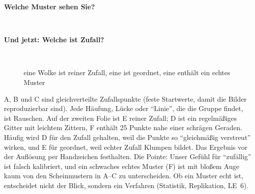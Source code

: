 \begin{description}
\item[{\rot\bf Welche Muster sehen Sie?}]~\\[-\lblskip]
\begin{center}
\end{center}
\os{\newpage}

\item[{\rot\bf Und jetzt: Welche ist Zufall?}]~\\[-\lblskip]
\begin{center}
\end{center}
\bi
  \ite eine Wolke ist reiner Zufall, eine ist geordnet, eine enthält ein
    echtes Muster
\ei
\os{\newpage}
\end{description}

\begin{lehrhinweis}
A, B und C sind gleichverteilte Zufallspunkte (feste Startwerte, damit
die Bilder reproduzierbar sind). Jede Häufung, Lücke oder \enquote{Linie},
die die Gruppe findet, ist Rauschen. Auf der zweiten Folie ist E reiner
Zufall; D ist ein regelmäßiges Gitter mit leichtem Zittern, F enthält 25
Punkte nahe einer schrägen Geraden. Häufig wird D für den Zufall gehalten,
weil die Punkte so \enquote{gleichmäßig verstreut} wirken, und E für
geordnet, weil echter Zufall Klumpen bildet. Das Ergebnis vor der
Auflösung per Handzeichen festhalten. Die Pointe: Unser Gefühl für
\enquote{zufällig} ist falsch kalibriert, und ein schwaches echtes Muster
(F) ist mit bloßem Auge kaum von den Scheinmustern in A--C zu
unterscheiden. Ob ein Muster echt ist, entscheidet nicht der Blick, sondern
ein Verfahren (Statistik, Replikation, LE~6).
\end{lehrhinweis}

